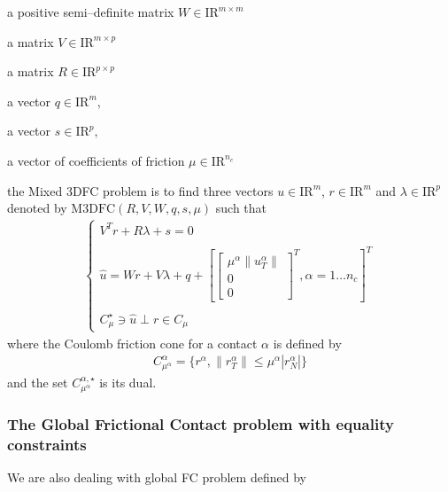 \begin{DoxyItemize}
\item a positive semi--definite matrix ${W} \in {\mathrm{I\!R}}^{m \times m}$ 
\item a matrix ${V} \in {\mathrm{I\!R}}^{m \times p}$ 
\item a matrix ${R} \in {\mathrm{I\!R}}^{p \times p}$ 
\item a vector $q \in {\mathrm{I\!R}}^{m}$, 
\item a vector $s \in {\mathrm{I\!R}}^{p}$, 
\item a vector of coefficients of friction $\mu \in {\mathrm{I\!R}}^{n_c}$ 
\end{DoxyItemize}the Mixed 3\+D\+F\+C problem is to find three vectors $u\in{\mathrm{I\!R}}^m$, $r\in {\mathrm{I\!R}}^m$ and $\lambda \in {\mathrm{I\!R}}^p$ denoted by $\mathrm{M3DFC}(R,V,W,q,s,\mu)$ such that \begin{eqnarray*}\label{eq:lcp1} \begin{cases} V^T {r} + R \lambda + s = 0 \\ \\ \hat u = W {r} + V\lambda + q +\left[ \left[\begin{array}{c} \mu^\alpha \|u^\alpha_T\|\\ 0 \\ 0 \end{array}\right]^T, \alpha = 1 \ldots n_c \right]^T \\ \\ C^\star_{\mu} \ni {\hat u} \perp r \in C_{\mu} \end{cases} \end{eqnarray*} where the Coulomb friction cone for a contact $\alpha$ is defined by \begin{eqnarray*} \label{eq:CCC} C_{\mu^\alpha}^{\alpha} = \{r^\alpha, \|r^\alpha_T \| \leq \mu^\alpha |r^\alpha_N| \} \end{eqnarray*} and the set $C^{\alpha,\star}_{\mu^\alpha}$ is its dual. \hypertarget{index_globalfclib}{}\subsubsection{The Global Frictional Contact problem with equality constraints}\label{index_globalfclib}
We are also dealing with global F\+C problem defined by

